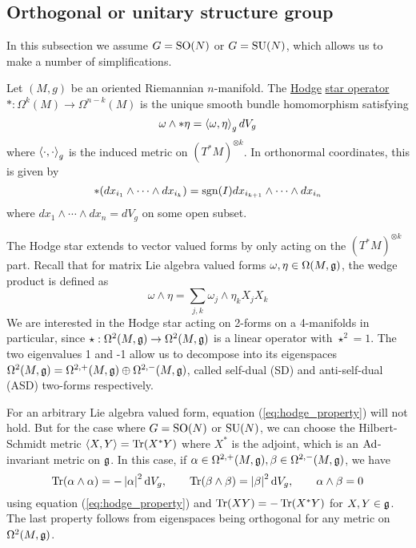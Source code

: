 \subsection{Orthogonal or unitary structure group}
In this subsection we assume $G=\operatorname{SO}(N)$ or  $G=\operatorname{SU}(N)$, which allows us to
make a number of simplifications.
\begin{defn}
	Let $(M,g)$ be an oriented Riemannian  $n$-manifold. The \underline{Hodge}
	\underline{star operator} $* : \Omega^k(M) \to \Omega^{n-k}(M)$ is the 
	unique smooth bundle homomorphism satisfying 
	\begin{equation} \label{eq:hodge_property}
	\omega \wedge *\eta = \gen{\omega,\eta}_g dV_g
	\end{equation}
	where $\gen{\cdot,\cdot}_g$ is the induced metric on $(T^*M)^{\otimes k}$.
	In orthonormal coordinates, this is given by
	\[
	*(dx_{i_1}\wedge \cdots\wedge dx_{i_k}) = \operatorname{sgn}(I)dx_{i_{k+1}}\wedge \cdots \wedge
	dx_{i_n} 
	\] 
	where $dx_1\wedge\cdots\wedge dx_n = dV_g$ on some open subset.
\end{defn}
The Hodge star extends to vector valued forms by only acting on the
$(T^*M)^{\otimes k}$ part. Recall that 
for matrix Lie algebra valued forms $\omega,\eta\in\Omega(M,\operatorname{\mathfrak{g}})$, the wedge 
product is defined as 
\begin{equation}
    \omega\wedge\eta = \sum_{j,k} \omega_j\wedge \eta_k X_j X_k 
\end{equation}
We are interested in the Hodge star acting on 2-forms on a 4-manifolds in
particular, since $\star : \Omega^2(M,\operatorname{\mathfrak{g}})\to\Omega^2(M,\operatorname{\mathfrak{g}})$ is a linear operator
with $\star^2= 1$. The two eigenvalues 1 and -1 allow us to decompose into its
eigenspaces $\Omega^2(M,\operatorname{\mathfrak{g}}) = \Omega^{2,+}(M,\operatorname{\mathfrak{g}}) \oplus \Omega^{2,-}(M,\operatorname{\mathfrak{g}})$,
called self-dual (SD) and anti-self-dual (ASD) two-forms respectively.

For an arbitrary Lie algebra valued form, equation (\ref{eq:hodge_property})
will not hold. But for the case where $G=\operatorname{SO}(N)$ or  $\operatorname{SU}(N)$, we can choose the
Hilbert-Schmidt metric  $\gen{X,Y}=\Tr(X^*Y)$ where $X^*$ is the adjoint, which
is an $\operatorname{Ad}$-invariant metric on $\operatorname{\mathfrak{g}}$.  In this case, if 
$\alpha \in \Omega^{2,+}(M,\operatorname{\mathfrak{g}}), \beta \in \Omega^{2,-}(M,\operatorname{\mathfrak{g}})$, we have
\begin{equation} \label{eq:trace_hodge}
\Tr(\alpha\wedge \alpha) = -\abs{\alpha}^2 \odif{V}_g, \qquad
\Tr(\beta\wedge \beta) = \abs{\beta}^2 \odif{V}_g, \qquad
\alpha\wedge \beta = 0
\end{equation}
using equation (\ref{eq:hodge_property}) and $\operatorname{Tr}(XY) = -\operatorname{Tr}(X^*Y)$ for
$X,Y\in\operatorname{\mathfrak{g}}$. The last property follows from eigenspaces being orthogonal for any
metric on $\Omega^2(M,\operatorname{\mathfrak{g}})$.


